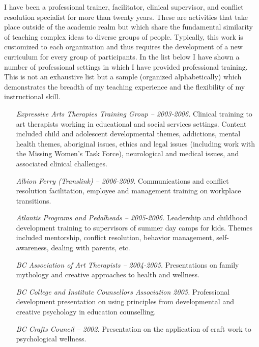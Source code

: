 \documentclass[10pt,DIV09,letterpaper,oneside,headsepline]{scrreprt}
\begin{document}
I have been a professional trainer, facilitator, clinical supervisor, and conflict resolution specialist for more than twenty years. These are activities that take place outside of the academic realm but which share the fundamental similarity of teaching complex ideas to diverse groups of people. Typically, this work is customized to each organization and thus requires the development of a new curriculum for every group of participants. In the list below I have shown a number of professional settings in which I have provided professional training. This is not an exhaustive list but a sample (organized alphabetically) which demonstrates the breadth of my teaching experience and the flexibility of my instructional skill.

\begin{itemize}
\item [\textit{Expressive Arts Therapies Training Group -- 2003-2006.}] 
Clinical training to art therapists working in educational and social services settings. Content included child and adolescent developmental themes, addictions, mental health themes, aboriginal issues, ethics and legal issues (including work with the Missing Women's Task Force), neurological and medical issues, and associated clinical challenges.

\item [\textit{Albion Ferry (Translink) -- 2006-2009.}]
Communications and conflict resolution facilitation, employee and management training on workplace transitions.

\item [\textit{Atlantis Programs and Pedalheads -- 2005-2006.}]
Leadership and childhood development training to supervisors of summer day camps for kids. Themes included mentorship, conflict resolution, behavior management, self-awareness, dealing with parents, etc.

\item [\textit{BC Association of Art Therapists -- 2004-2005.}]
Presentations on family mythology and creative approaches to health and wellness.

\item [\textit{BC College and Institute Counsellors Association 2005.}]
Professional development presentation on using principles from developmental and creative psychology in education counselling.

\item [\textit{BC Crafts Council -- 2002.}]
Presentation on the application of craft work to psychological wellness.


\end{itemize}
\end{document}
